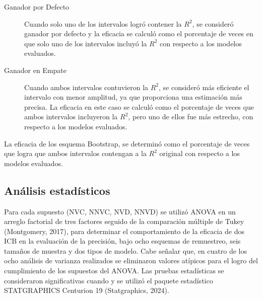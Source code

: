 \begin{description}

	\item[Ganador por Defecto] Cuando solo uno de los intervalos logró contener la \( R^2 \), se consideró ganador por defecto y la eficacia se calculó como el porcentaje de veces en que solo uno de los intervalos incluyó la \( R^2 \)
	con respecto a los modelos evaluados.
	
	
	\item[Ganador en Empate] Cuando ambos intervalos contuvieron la \( R^2 \), se consideró más eficiente el intervalo con menor amplitud, ya que proporciona una estimación más precisa. La eficacia en este caso se calculó como el porcentaje de veces que ambos intervalos incluyeron la \( R^2 \), pero uno de ellos fue más estrecho, con respecto a los modelos evaluados.
	
\end{description}

 
La eficacia de los esquema Bootstrap, se determinó como el porcentaje de veces que logra que ambos intervalos contengan a la \( R^2 \) original con respecto a los modelos evaluados.\\



	 	
	 	
	 	
	 	
	 	
	 	
	 	
	 	
\subsection{Análisis estadísticos}
Para cada supuesto (NVC, NNVC, NVD, NNVD) se utilizó ANOVA en un arreglo factorial de tres factores seguido de la comparación múltiple de Tukey (Montgomery, 2017), para determinar el comportamiento de la eficacia de dos ICB en la evaluación de la precisión, bajo ocho esquemas de remuestreo, seis tamaños de muestra y dos tipos de modelo. Cabe señalar que, en cuatro de los ocho análisis de varianza realizados se eliminaron valores atípicos para el logro del cumplimiento de los supuestos del ANOVA.
Las pruebas estadísticas se consideraron significativas cuando  y se utilizó el paquete estadístico STATGRAPHICS Centurion 19 (Statgraphics, 2024).




